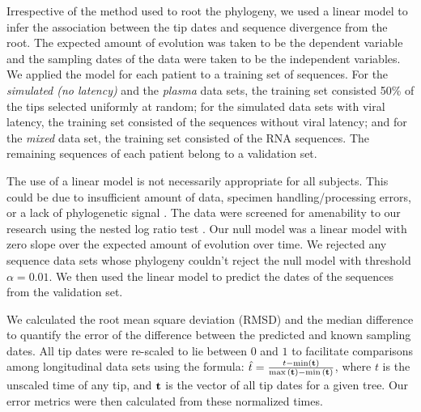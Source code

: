 \documentclass{bmcart}
\begin{document}
Irrespective of the method used to root the phylogeny, we used a linear model to infer the association between the tip dates and sequence divergence from the root. 
The expected amount of evolution was taken to be the dependent variable and the sampling dates of the data were taken to be the independent variables.
We applied the model for each patient to a training set of sequences.
For the \emph{simulated (no latency)} and the \emph{plasma} data sets, the training set consisted 50\% of the tips selected uniformly at random; for the simulated data sets with viral latency, the training set consisted of the sequences without viral latency; and for the \emph{mixed} data set, the training set consisted of the RNA sequences.
The remaining sequences of each patient belong to a validation set.

The use of a linear model is not necessarily appropriate for all subjects.
This could be due to insufficient amount of data, specimen handling/processing errors, or a lack of phylogenetic signal \cite{Tempest}.
The data were screened for amenability to our research using the nested log ratio test \cite{Ho14}. 
Our null model was a linear model with zero slope over the expected amount of evolution over time.
We rejected any sequence data sets whose phylogeny couldn't reject the null model with threshold $\alpha=0.01$.
We then used the linear model to predict the dates of the sequences from the validation set.

We calculated the root mean square deviation (RMSD) and the median difference to quantify the error of the difference between the predicted and known sampling dates.
All tip dates were re-scaled to lie between $0$ and $1$ to facilitate comparisons among longitudinal data sets using the formula: $\hat{t} = \frac{t - \min(\bf{t}) }{ \max{(\bf{t})} - \min{(\bf{t}})}$, where $t$ is the unscaled time of any tip, and $\bf{t}$ is the vector of all tip dates for a given tree. 
Our error metrics were then calculated from these normalized times.%
\end{document}
